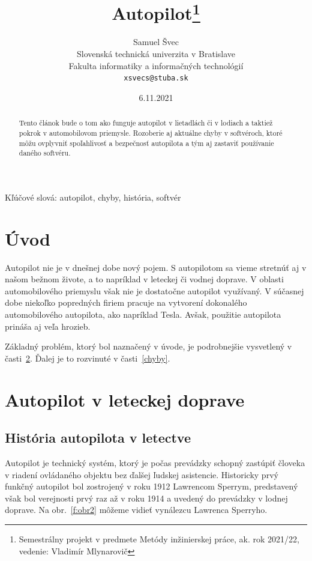 \documentclass[10pt,twoside,slovak,a4paper]{article}
\title{Autopilot\thanks{Semestrálny projekt v predmete Metódy inžinierskej práce, ak. rok 2021/22, vedenie: Vladimír Mlynarovič}} %
\author{Samuel Švec\\[2pt]
	{\small Slovenská technická univerzita v Bratislave}\\
	{\small Fakulta informatiky a informačných technológií}\\
	{\small \texttt{xsvecs@stuba.sk}}
	}
\date{\small 6.11.2021} %
\begin{document}
\maketitle

\begin{abstract}
Tento článok bude o tom ako funguje autopilot v lietadlách či v lodiach a taktiež pokrok v automobilovom priemysle. Rozoberie aj aktuálne chyby v softvéroch, ktoré môžu ovplyvniť spoľahlivosť a bezpečnosť autopilota a tým aj zastaviť používanie daného softvéru.
\end{abstract}

Kľúčové slová: autopilot, chyby, história, softvér

\section{Úvod}

Autopilot nie je v dnešnej dobe nový pojem. S autopilotom sa vieme stretnúť aj v našom bežnom živote, a to napríklad v leteckej či vodnej doprave. V oblasti automobilového priemyslu však nie je dostatočne autopilot využívaný. V súčasnej dobe niekoľko popredných firiem pracuje na vytvorení dokonalého automobilového autopilota, ako napríklad Tesla. Avšak, použitie autopilota prináša aj veľa hrozieb. 

Základný problém, ktorý bol naznačený v úvode, je podrobnejšie vysvetlený v časti~\ref{AFA}.
Ďalej je to rozvinuté v časti~\ref{chyby}.


\section{Autopilot v leteckej doprave} \label{AFA}

\subsection{História autopilota v letectve} 

Autopilot je technický systém, ktorý je počas prevádzky schopný zastúpiť človeka v riadení ovládaného objektu bez ďalšej ľudskej asistencie. Historicky prvý funkčný autopilot bol zostrojený v roku 1912 Lawrencom Sperrym, predstavený však bol verejnosti prvý raz až v roku 1914 a uvedený do prevádzky v lodnej doprave.\cite{AVA} Na obr.~\ref{f:obr2} môžeme vidieť vynálezcu Lawrenca Sperryho.
\end{document}
